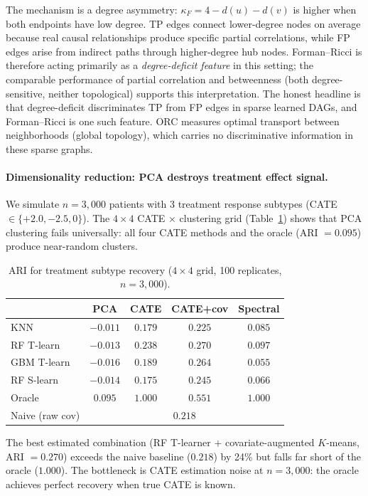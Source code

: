 \documentclass{article}
\begin{document}
The mechanism is a degree asymmetry: $\kappa_F = 4 - d(u) - d(v)$ is higher when both endpoints have low degree.
TP edges connect lower-degree nodes on average because real causal relationships produce specific partial correlations, while FP edges arise from indirect paths through higher-degree hub nodes.
Forman--Ricci is therefore acting primarily as a \emph{degree-deficit feature} in this setting; the comparable performance of partial correlation and betweenness (both degree-sensitive, neither topological) supports this interpretation.
The honest headline is that degree-deficit discriminates TP from FP edges in sparse learned DAGs, and Forman--Ricci is one such feature.
ORC measures optimal transport between neighborhoods (global topology), which carries no discriminative information in these sparse graphs.

\paragraph{Dimensionality reduction: PCA destroys treatment effect signal.}
We simulate $n = 3{,}000$ patients with 3 treatment response subtypes (CATE $\in \{+2.0, -2.5, 0\}$).
The $4 \times 4$ CATE $\times$ clustering grid (Table~\ref{tab:hte}) shows that PCA clustering fails universally: all four CATE methods and the oracle (ARI $= 0.095$) produce near-random clusters.

\begin{table}[t]
\centering
\caption{ARI for treatment subtype recovery ($4 \times 4$ grid, 100 replicates, $n = 3{,}000$).}
\label{tab:hte}
\small
\begin{tabular}{@{}lcccc@{}}
\toprule
 & \textbf{PCA} & \textbf{CATE} & \textbf{CATE+cov} & \textbf{Spectral} \\
\midrule
KNN       & $-0.011$ & $0.179$ & $0.225$ & $0.085$ \\
RF T-learn  & $-0.013$ & $0.238$ & $\mathbf{0.270}$ & $0.097$ \\
GBM T-learn & $-0.016$ & $0.189$ & $0.264$ & $0.055$ \\
RF S-learn  & $-0.014$ & $0.175$ & $0.245$ & $0.066$ \\
\midrule
Oracle        & $0.095$  & $1.000$ & $0.551$ & $1.000$ \\
Naive (raw cov) & \multicolumn{4}{c}{$0.218$} \\
\bottomrule
\end{tabular}
\end{table}

The best estimated combination (RF T-learner $+$ covariate-augmented $K$-means, ARI $= 0.270$) exceeds the naive baseline ($0.218$) by 24\% but falls far short of the oracle ($1.000$).
The bottleneck is CATE estimation noise at $n = 3{,}000$: the oracle achieves perfect recovery when true CATE is known.
\end{document}
